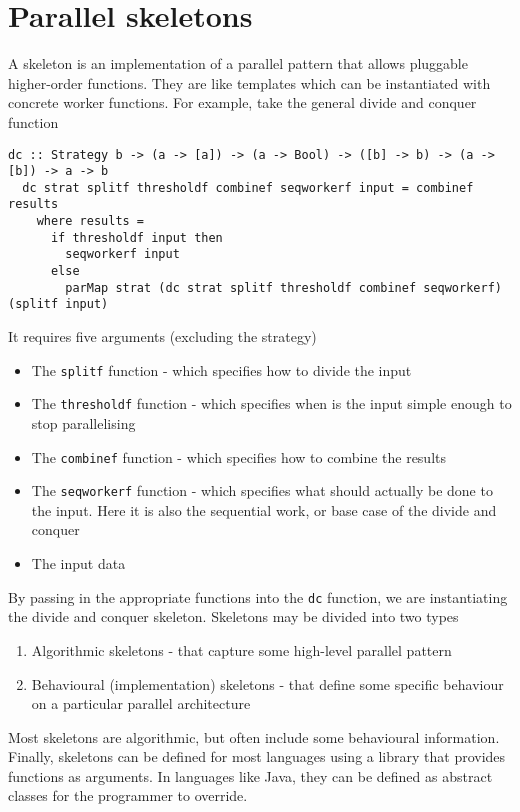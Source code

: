 \documentclass[CS4204-Notes.tex]{subfiles}
\begin{document}
\section{Parallel skeletons}
A skeleton is an implementation of a parallel pattern that allows pluggable higher-order functions. They are like templates which can be instantiated with concrete worker functions. For example, take the general divide and conquer function
\begin{lstlisting}[caption={A general divide and conquer pattern}]
  dc :: Strategy b -> (a -> [a]) -> (a -> Bool) -> ([b] -> b) -> (a -> [b]) -> a -> b
  dc strat splitf thresholdf combinef seqworkerf input = combinef results
    where results =
      if thresholdf input then
        seqworkerf input
      else
        parMap strat (dc strat splitf thresholdf combinef seqworkerf) (splitf input)
\end{lstlisting}
It requires five arguments (excluding the strategy)
\begin{itemize}
\item The \texttt{splitf} function - which specifies how to divide the input
\item The \texttt{thresholdf} function - which specifies when is the input simple enough to stop parallelising
\item The \texttt{combinef} function - which specifies how to combine the results
\item The \texttt{seqworkerf} function - which specifies what should actually be done to the input. Here it is also the sequential work, or base case of the divide and conquer
\item The input data
\end{itemize}
By passing in the appropriate functions into the \texttt{dc} function, we are instantiating the divide and conquer skeleton.
\n
Skeletons may be divided into two types
\begin{enumerate}
\item Algorithmic skeletons - that capture some high-level parallel pattern
\item Behavioural (implementation) skeletons - that define some specific behaviour on a particular parallel architecture
\end{enumerate}
Most skeletons are algorithmic, but often include some behavioural information.
\n
Finally, skeletons can be defined for most languages using a library that provides functions as arguments. In languages like Java, they can be defined as abstract classes for the programmer to override. 
\end{document}
